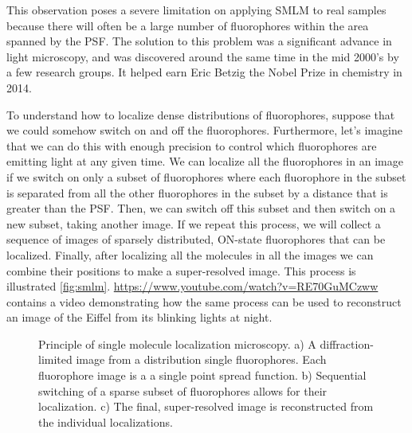 \documentclass[10pt,a4paper]{book}
\begin{document}
This observation poses a severe limitation on applying SMLM to real samples because there will often be a large number of fluorophores within the area spanned by the PSF. The solution to this problem was a significant advance in light microscopy, and was discovered around the same time in the mid 2000's by a few research groups. It helped earn Eric Betzig the Nobel Prize in chemistry in 2014.

To understand how to localize dense distributions of fluorophores, suppose that we could somehow switch on and off the fluorophores. Furthermore, let's imagine that we can do this with enough precision to control which fluorophores are emitting light at any given time. We can localize all the fluorophores in an image if we switch on only a subset of fluorophores where each fluorophore in the subset is separated from all the other fluorophores in the subset by a distance that is greater than the PSF. Then, we can switch off this subset and then switch on a new subset, taking another image. If we repeat this process, we will collect a sequence of images of sparsely distributed, ON-state fluorophores that can be localized. Finally, after localizing all the molecules in all the images we can combine their positions to make a super-resolved image. This process is illustrated \autoref{fig:smlm}. \url{https://www.youtube.com/watch?v=RE70GuMCzww} contains a video demonstrating how the same process can be used to reconstruct an image of the Eiffel from its blinking lights at night.

\begin{figure}
    \centering
    \caption{Principle of single molecule localization microscopy. a) A diffraction-limited image from a distribution single fluorophores. Each fluorophore image is a a single point spread function. b) Sequential switching of a sparse subset of fluorophores allows for their localization. c) The final, super-resolved image is reconstructed from the individual localizations.}
    \label{fig:smlm}
\end{figure}
\end{document}
